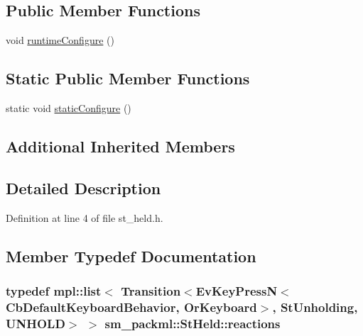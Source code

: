 \subsection*{Public Member Functions}
\begin{DoxyCompactItemize}
\item 
void \hyperlink{structsm__packml_1_1StHeld_a718472ff6cb7dad6febe341dc8e06302}{runtime\+Configure} ()
\end{DoxyCompactItemize}
\subsection*{Static Public Member Functions}
\begin{DoxyCompactItemize}
\item 
static void \hyperlink{structsm__packml_1_1StHeld_a9726a9afc007dbe38e5adcec3df6511e}{static\+Configure} ()
\end{DoxyCompactItemize}
\subsection*{Additional Inherited Members}


\subsection{Detailed Description}


Definition at line 4 of file st\+\_\+held.\+h.



\subsection{Member Typedef Documentation}
\subsubsection[{\texorpdfstring{reactions}{reactions}}]{\setlength{\rightskip}{0pt plus 5cm}typedef mpl\+::list$<$ Transition$<$Ev\+Key\+PressN$<$Cb\+Default\+Keyboard\+Behavior, {\bf Or\+Keyboard}$>$, {\bf St\+Unholding}, {\bf U\+N\+H\+O\+LD}$>$ $>$ {\bf sm\+\_\+packml\+::\+St\+Held\+::reactions}}\hypertarget{structsm__packml_1_1StHeld_a808a22c5c16ab47ef30db3c477b8d543}{}\label{structsm__packml_1_1StHeld_a808a22c5c16ab47ef30db3c477b8d543}


